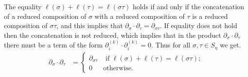 \documentclass[11pt,fleqn]{article}
\begin{document}
The equality $\ell(\sigma) + \ell(\tau) = \ell(\sigma\tau)$ holds if and only 
if the concatenation of a reduced composition of $\sigma$ with a reduced 
composition of $\tau$ is a reduced composition of $\sigma\tau$, and this 
implies that $\partial_\sigma \cdot \partial_\tau = \partial_{\sigma\tau}$.
If equality does not hold then the concatenation is not reduced, which implies
that in the product $\partial_\sigma \cdot \partial_\tau$ there must be a 
term of the form $\partial_{i}^{(k)} \cdot \partial_i^{(k)} = 0$. Thus for 
all $\sigma, \tau \in S_\eta$ we get.
\begin{align*}
\partial_\sigma \cdot \partial_\tau &= 
  \begin{cases}
  \partial_{\sigma \tau} &\mbox{ if } \ell(\sigma) + \ell(\tau) 
    = \ell(\sigma\tau); \\
  0 & \mbox{otherwise.}
  \end{cases}
\end{align*}
\end{document}
